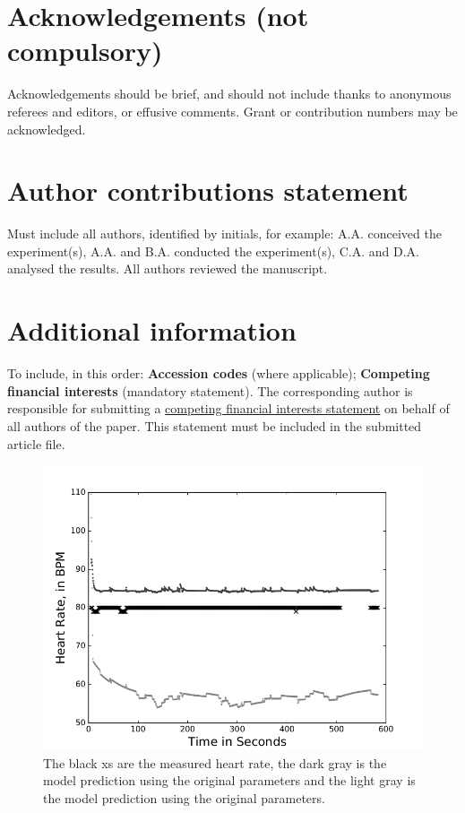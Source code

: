 \documentclass[fleqn,10pt]{wlscirep}
\begin{document}
\section*{Acknowledgements (not compulsory)}
Acknowledgements should be brief, and should not include thanks to anonymous referees and editors, or effusive comments. Grant or contribution numbers may be acknowledged.
\section*{Author contributions statement}
Must include all authors, identified by initials, for example:
A.A. conceived the experiment(s),  A.A. and B.A. conducted the experiment(s), C.A. and D.A. analysed the results.  All authors reviewed the manuscript. 
\section*{Additional information}
To include, in this order: \textbf{Accession codes} (where applicable); \textbf{Competing financial interests} (mandatory statement). 
The corresponding author is responsible for submitting a \href{http://www.nature.com/srep/policies/index.html#competing}{competing financial interests statement} on behalf of all authors of the paper. This statement must be included in the submitted article file.


\begin{figure}[ht]
                \centering
        \includegraphics[width=\linewidth]{figures/s27193-3271-03-15-13-26n}
       \caption{The black xs are the measured heart rate, the dark gray is the model prediction using the original parameters and the light gray is the model prediction using the original parameters.}
       \label{fig:paramscomparsionNLopt}
\end{figure}
\end{document}
